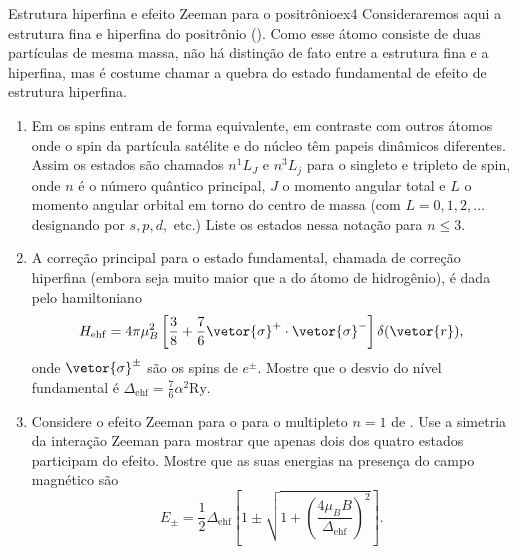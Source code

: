 \begin{exercício}{Estrutura hiperfina e efeito Zeeman para o positrônio}{ex4}
   Consideraremos aqui a estrutura fina e hiperfina do positrônio (). Como esse átomo consiste de duas partículas de mesma massa, não há distinção de fato entre a estrutura fina e a hiperfina, mas é costume chamar a quebra do estado fundamental de efeito de estrutura hiperfina.
   \begin{enumerate}[label=(\alph*)]
      \item Em  os spins entram de forma equivalente, em contraste com outros átomos onde o spin da partícula satélite e do núcleo têm papeis dinâmicos diferentes. Assim os estados  são chamados \(n^1L_J\) e \(n^3 L_j\) para o singleto e tripleto de spin, onde \(n\) é o número quântico principal, \(J\) o momento angular total e \(L\) o momento angular orbital em torno do centro de massa (com \(L = 0, 1, 2, \dots\) designando por \(s,p,d,\) etc.) Liste os estados nessa notação para \(n \leq 3.\)
      \item A correção principal para o estado fundamental, chamada de correção hiperfina (embora seja muito maior que a do átomo de hidrogênio), é dada pelo hamiltoniano
         \begin{equation*}
            H_\mathrm{ehf} = 4\pi \mu_B^2 \left[\frac38 + \frac76 \vetor{\sigma}^+ \cdot \vetor{\sigma}^-\right]\delta(\vetor{r}),
         \end{equation*}
         onde \(\vetor{\sigma}^{\pm}\) são os spins de \(e^{\pm}.\) Mostre que o desvio do nível fundamental é \(\Delta_{\mathrm{ehf}} = \frac76 \alpha^2 \mathrm{Ry}.\)
      \item Considere o efeito Zeeman para o para o multipleto \(n = 1\) de . Use a simetria da interação Zeeman para mostrar que apenas dois dos quatro estados participam do efeito. Mostre que as suas energias na presença do campo magnético são
         \begin{equation*}
         E_\pm = \frac12 \Delta_\mathrm{ehf} \left[1 \pm \sqrt{1 + \left(\frac{4 \mu_B B}{\Delta_\mathrm{ehf}}\right)^2}\right].
         \end{equation*}
   \end{enumerate}
\end{exercício}
